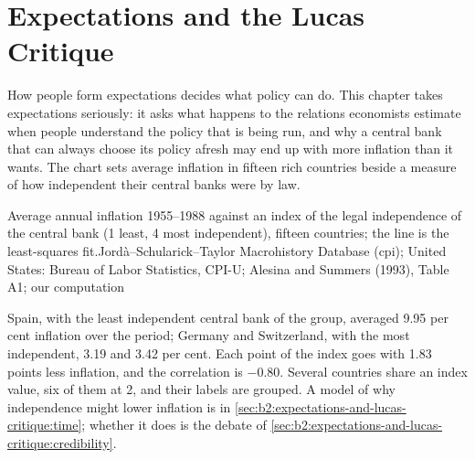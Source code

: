 \chapter{Expectations and the Lucas Critique}\label{ch:b2:expectations-and-lucas-critique}

How people form expectations decides what policy can do. This chapter takes expectations seriously: it asks what
happens to the relations economists estimate when people understand the policy that is being run, and why a central bank
that can always choose its policy afresh may end up with more inflation than it wants. The chart sets average inflation in
fifteen rich countries beside a measure of how independent their central banks were by law.

\begin{openingchart}{Average annual inflation 1955--1988 against an index of the legal independence of the central bank
  (1 least, 4 most independent), fifteen countries; the line is the least-squares fit.}{Jord\`a--Schularick--Taylor
  Macrohistory Database (cpi); United States: Bureau of Labor Statistics, CPI-U; Alesina and Summers
  (1993), Table A1; our computation}
\end{openingchart}

Spain, with the least independent central bank of the group, averaged 9.95 per cent inflation over the period; Germany and
Switzerland, with the most independent, 3.19 and 3.42 per cent. Each point of the index goes with 1.83 points less inflation,
and the correlation is $-0.80$. Several countries share an index value, six of them at 2, and their labels are grouped. A model of
why independence might lower inflation is in \cref{sec:b2:expectations-and-lucas-critique:time}; whether it does is the
debate of \cref{sec:b2:expectations-and-lucas-critique:credibility}.

